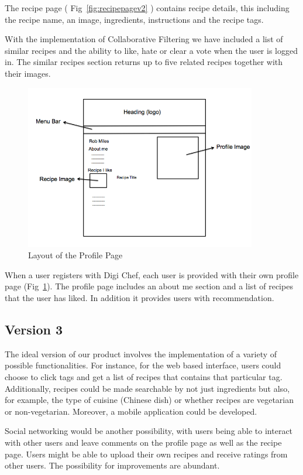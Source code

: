 The recipe page ( Fig~\ref{fig:recipepagev2} ) contains recipe details, this including the recipe name, an image, ingredients, instructions and the recipe tags. 

With the implementation of Collaborative Filtering we have included a list of similar recipes and the ability to like, hate or clear a vote when the user is logged in. The similar recipes section returns up to five related recipes together with their images. 

 
 \begin{figure}[H]
 \begin{center}
\includegraphics[width=0.9\textwidth]{profile_page_v2}
\caption{Layout of the Profile Page}
\label{fig:profilepagev2}
\end{center}
\end{figure}

When a user registers with Digi Chef, each user is provided with their own profile page (Fig~\ref{fig:profilepagev2}). The profile page includes an about me section and a list of recipes that the user has liked. In addition it provides users with recommendation.

\subsection{Version 3}

The ideal version of our product involves the implementation of a variety of possible functionalities. For instance, for the web based interface, users could choose to click tags and get a list of recipes that contains that particular tag. Additionally, recipes could be made searchable by not just ingredients but also, for example, the type of cuisine (Chinese dish) or whether recipes are vegetarian or non-vegetarian. Moreover, a mobile application could be developed. 

Social networking would be another possibility, with users being able to interact with other users and leave comments on the profile page as well as the recipe page. Users might be able to upload their own recipes and receive ratings from other users. The possibility for improvements are abundant.

